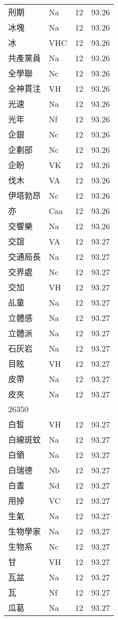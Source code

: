 \documentclass[twocolumn]{book}
\begin{document}
\begin{supertabular}{llrr}
刑期 & Na & 12 &  93.26\\
冰塊 & Na & 12 &  93.26\\
冰 & VHC & 12 &  93.26\\
共產黨員 & Na & 12 &  93.26\\
全學聯 & Nc & 12 &  93.26\\
全神貫注 & VH & 12 &  93.26\\
光速 & Na & 12 &  93.26\\
光年 & Nf & 12 &  93.26\\
企銀 & Nc & 12 &  93.26\\
企劃部 & Nc & 12 &  93.26\\
企盼 & VK & 12 &  93.26\\
伐木 & VA & 12 &  93.26\\
伊塔勃昂 & Nc & 12 &  93.26\\
亦 & Caa & 12 &  93.26\\
交響樂 & Na & 12 &  93.26\\
交誼 & VA & 12 &  93.27\\
交通局長 & Na & 12 &  93.27\\
交界處 & Nc & 12 &  93.27\\
交加 & VH & 12 &  93.27\\
乩童 & Na & 12 &  93.27\\
立體感 & Na & 12 &  93.27\\
立體派 & Na & 12 &  93.27\\
石灰岩 & Na & 12 &  93.27\\
目眩 & VH & 12 &  93.27\\
皮帶 & Na & 12 &  93.27\\
皮夾 & Na & 12 &  93.27\\
26350\\
白皙 & VH & 12 &  93.27\\
白線斑蚊 & Na & 12 &  93.27\\
白領 & Na & 12 &  93.27\\
白瑞德 & Nb & 12 &  93.27\\
白晝 & Nd & 12 &  93.27\\
用掉 & VC & 12 &  93.27\\
生氣 & Na & 12 &  93.27\\
生物學家 & Na & 12 &  93.27\\
生物系 & Nc & 12 &  93.27\\
甘 & VH & 12 &  93.27\\
瓦盆 & Na & 12 &  93.27\\
瓦 & Nf & 12 &  93.27\\
瓜葛 & Na & 12 &  93.27\\

\end{supertabular}
\end{document}
